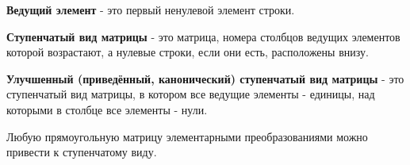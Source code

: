 \documentclass[oneside]{book}
\begin{document}
	\textbf{Ведущий элемент} - это
	первый ненулевой элемент строки.

	\textbf{Ступенчатый вид матрицы} - это
	матрица, номера столбцов ведущих элементов которой
	возрастают, а нулевые строки, если они есть,
	расположены внизу.

	\textbf{Улучшенный (приведённый, канонический) ступенчатый вид матрицы} - это
	ступенчатый вид матрицы, в котором все ведущие
	элементы - единицы, над которыми в столбце все
	элементы - нули.

	Любую прямоугольную матрицу элементарными преобразованиями
	можно привести к ступенчатому виду.
\end{document}
